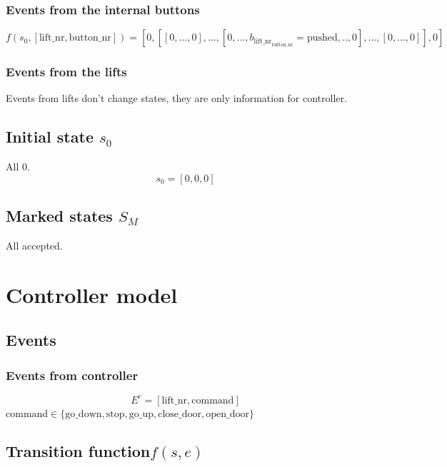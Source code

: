\documentclass[12pt]{article}
\begin{document}
\subsubsection{Events from the internal buttons}
\[
  f(s_0,[\text{lift\_nr},\text{button\_nr}]) =
  [0,[[0,...,0],...,[0,...,b_{\text{lift\_nr}_\text{button\_nr}}=\text{pushed},..,0],...,[0,...,0]],0]
\]

\subsubsection{Events from the lifts}
Events from lifts don't change states, they are only information for controller.

\subsection{Initial state \(s_0\)}
All 0.
\[
  s_0 = [0,0,0]
\]



\subsection{Marked states \(S_M\)}
All accepted.

\section{Controller model}

\subsection{Events}
\subsubsection{Events from controller}
\[ E^c = [\text{lift\_nr}, \text{command}] \]
\(\text{command} \in \{\text{go\_down},\text{stop},\text{go\_up},\text{close\_door},\text{open\_door}\}\)

\subsection{Transition function\(f(s,e)\)}
\end{document}
